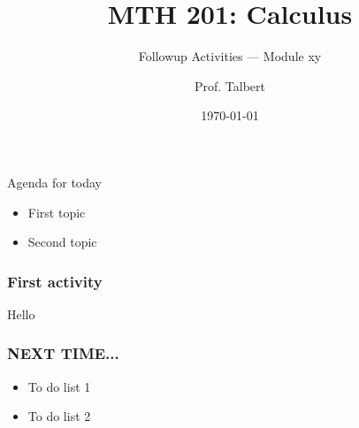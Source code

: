 \documentclass{beamer}
\title{MTH 201: Calculus}
\subtitle{Followup Activities --- Module xy}
\author{Prof. Talbert}
\institute{GVSU}
\date{\today}
\begin{document}
\frame{\titlepage}


\begin{frame}{Agenda for today}
    \begin{itemize}
        \item<1-> First topic
        \item<2-> Second topic 
    \end{itemize}
\end{frame}

\begin{frame}
    \frametitle{First activity}

    Hello

\end{frame}

\begin{frame}
    \frametitle{NEXT TIME...}

    \begin{itemize}
        \item To do list 1
        \item To do list 2
    \end{itemize}

\end{frame}
\end{document}
